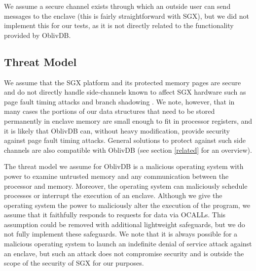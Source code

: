 \documentclass[conference]{IEEEtran}
\def\name/{OblivDB}
\begin{document}
We assume a secure channel exists through which an outside user can send messages to the enclave (this is fairly straightforward with SGX), but we did not implement this for our tests, as it is not directly related to the functionality provided by \name/.

\subsection{Threat Model}
We assume that the SGX platform and its protected memory pages are secure and do not directly handle side-channels known to affect SGX hardware such as page fault timing attacks \cite{XCP15} and branch shadowing \cite{LSG+16}. We note, however, that in many cases the portions of our data structures that need to be stored permanently in enclave memory are small enough to fit in processor registers, and it is likely that \name/ can, without heavy modification, provide security against page fault timing attacks. General solutions to protect against such side channels are also compatible with \name/ (see section \ref{related} for an overview). 

The threat model we assume for \name/ is a malicious operating system with power to examine untrusted memory and any communication between the processor and memory. Moreover, the operating system can maliciously schedule processes or interrupt the execution of an enclave. Although we give the operating system the power to maliciously alter the execution of the program, we assume that it faithfully responds to requests for data via OCALLs. This assumption could be removed with additional lightweight safeguards, but we do not fully implement these safeguards. We note that it is always possible for a malicious operating system to launch an indefinite denial of service attack against an enclave, but such an attack does not compromise security and is outside the scope of the security of SGX for our purposes. 
 
\end{document}
